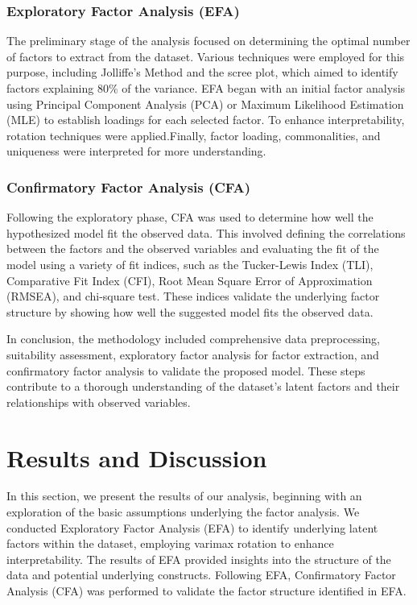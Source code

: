 \documentclass[11pt]{article}
\begin{document}
			\subsubsection{Exploratory Factor Analysis (EFA)}
		 	The preliminary stage of the analysis focused on determining the optimal number of factors to extract from the dataset. Various techniques were employed for this purpose, including Jolliffe's Method and the scree plot, which aimed to identify factors explaining 80\% of the variance. EFA began with an initial factor analysis using Principal Component Analysis (PCA) or Maximum Likelihood Estimation (MLE) to establish loadings for each selected factor. To enhance interpretability, rotation techniques were applied.Finally, factor loading, commonalities, and uniqueness were interpreted for more understanding.
		 
			\subsubsection{Confirmatory Factor Analysis (CFA)}
			Following the exploratory phase, CFA was used to determine how well the hypothesized model fit the observed data. This involved defining the correlations between the factors and the observed variables and evaluating the fit of the model using a variety of fit indices, such as the Tucker-Lewis Index (TLI), Comparative Fit Index (CFI), Root Mean Square Error of Approximation (RMSEA), and chi-square test. These indices validate the underlying factor structure by showing how well the suggested model fits the observed data.
		
		In conclusion, the methodology included comprehensive data preprocessing, suitability assessment, exploratory factor analysis for factor extraction, and confirmatory factor analysis to validate the proposed model. These steps contribute to a thorough understanding of the dataset's latent factors and their relationships with observed variables.
		
	\newpage
	\section{Results and Discussion}
	
	In this section, we present the results of our analysis, beginning with an exploration of the basic assumptions underlying the factor analysis. We conducted Exploratory Factor Analysis (EFA) to identify underlying latent factors within the dataset, employing varimax rotation to enhance interpretability. The results of EFA provided insights into the structure of the data and potential underlying constructs. Following EFA, Confirmatory Factor Analysis (CFA) was performed to validate the factor structure identified in EFA.
	
\end{document}
